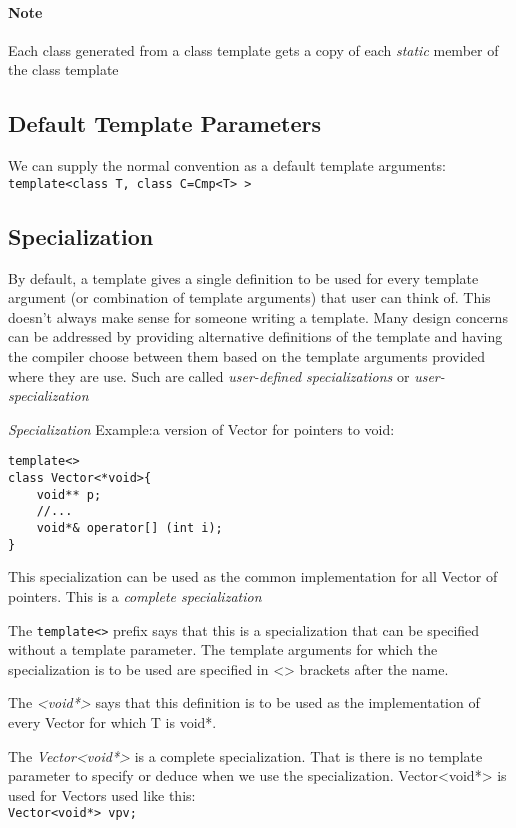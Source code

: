 \documentclass[a4paper,12pt]{book}
\begin{document}
\paragraph{Note} Each class generated from a class template gets a copy of each \emph{static} member of the class template

\subsection{Default Template Parameters}
We can supply the normal convention as a default template arguments:\\
\verb|template<class T, class C=Cmp<T> >|

\subsection{Specialization}
By default, a template gives a single definition to be used for every template argument (or combination of template arguments) that user can think of. This doesn't always make sense for someone writing a template. Many design concerns can be addressed by providing alternative definitions of the template and having the compiler choose between them based on the template arguments provided where they are use. Such are called \emph{user-defined specializations} or \emph{user-specialization}

\emph{Specialization} Example:a version of Vector for pointers to void:
\begin{verbatim}
template<>
class Vector<*void>{
    void** p;
    //...
    void*& operator[] (int i);
}
\end{verbatim}

This specialization can be used as the common implementation for all Vector of pointers. This is a \emph{complete specialization}

The \verb|template<>| prefix says that this is a specialization that can be specified without a template parameter. The template arguments for which the specialization is to be used are specified in <> brackets after the name.

The \emph{<void*>} says that this definition is to be used as the implementation of every Vector for which T is void*. 

The \emph{Vector<void*>} is a complete specialization. That is there is no template parameter to specify or deduce when we use the specialization. Vector<void*> is used for Vectors used like this:\\\verb|Vector<void*> vpv;|
\end{document}

